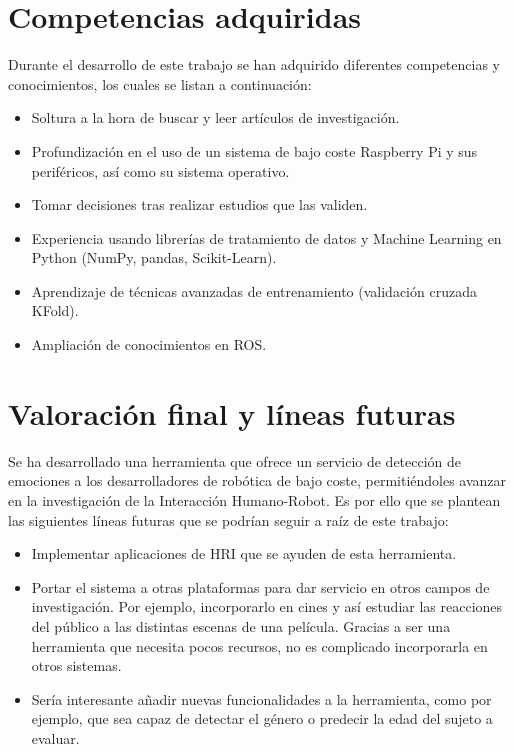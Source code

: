 \section{Competencias adquiridas}

Durante el desarrollo de este trabajo se han adquirido diferentes competencias y conocimientos, los cuales se listan a continuación:

\begin{itemize}
    \item Soltura a la hora de buscar y leer artículos de investigación.
    
    \item Profundización en el uso de un sistema de bajo coste Raspberry Pi y sus periféricos, así como su sistema operativo.
    
    \item Tomar decisiones tras realizar estudios que las validen.
    
    \item Experiencia usando librerías de tratamiento de datos y Machine Learning en Python (NumPy, pandas, Scikit-Learn).
    
    \item Aprendizaje de técnicas avanzadas de entrenamiento (validación cruzada KFold).
    
    \item Ampliación de conocimientos en ROS.
\end{itemize}

\section{Valoración final y líneas futuras}

Se ha desarrollado una herramienta que ofrece un servicio de detección de emociones a los desarrolladores de robótica de bajo coste, permitiéndoles avanzar en la investigación de la Interacción Humano-Robot. Es por ello que se plantean las siguientes líneas futuras que se podrían seguir a raíz de este trabajo:

\begin{itemize}
    \item Implementar aplicaciones de HRI que se ayuden de esta herramienta.
    
    \item Portar el sistema a otras plataformas para dar servicio en otros campos de investigación. Por ejemplo, incorporarlo en cines y así estudiar las reacciones del público a las distintas escenas de una película. Gracias a ser una herramienta que necesita pocos recursos, no es complicado incorporarla en otros sistemas.
    
    \item Sería interesante añadir nuevas funcionalidades a la herramienta, como por ejemplo, que sea capaz de detectar el género o predecir la edad del sujeto a evaluar.
\end{itemize}

